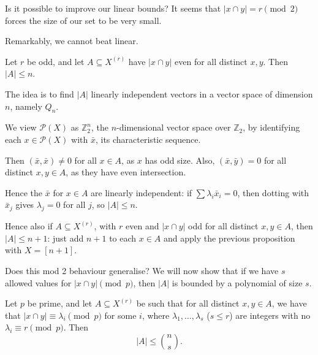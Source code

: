 \documentclass[12pt]{article}
\begin{document}
Is it possible to improve our linear bounds? It seems that $|x \cap y| = r \pmod 2$ forces the size of our set to be very small.


Remarkably, we cannot beat linear.

\begin{proposition}
	Let $r$ be odd, and let $A \subseteq X^{(r)}$ have $|x \cap y|$ even for all distinct $x, y$. Then $|A| \leq n$.
\end{proposition}

The idea is to find $|A|$ linearly independent vectors in a vector space of dimension $n$, namely $Q_n$.

\begin{proofbox}
	We view $\mathcal{P}(X)$ as $\mathbb{Z}_2^{n}$, the $n$-dimensional vector space over $\mathbb{Z}_2$, by identifying each $x \in \mathcal{P}(X)$ with $\bar x$, its characteristic sequence.

	Then $(\bar x, \bar x) \neq 0$ for all $x \in A$, as $x$ has odd size. Also, $(\bar x, \bar y) = 0$ for all distinct $x, y \in A$, as they have even intersection.

	Hence the $\bar x$ for $x \in A$ are linearly independent: if $\sum \lambda_i \bar x_i = 0$, then dotting with $\bar x_j$ gives $\lambda_j = 0$ for all $j$, so $|A| \leq n$.
\end{proofbox}

\begin{remark}
	Hence also if $A \subseteq X^{(r)}$, with $r$ even and $|x \cap y|$ odd for all distinct $x, y \in A$, then $|A| \leq n+1$: just add $n+1$ to each $x \in A$ and apply the previous proposition with $X = [n+1]$.
\end{remark}

Does this mod 2 behaviour generalise? We will now show that if we have $s$ allowed values for $|x \cap y| \pmod p$, then $|A|$ is bounded by a polynomial of size $s$.

\begin{theorem}
	Let $p$ be prime, and let $A \subseteq X^{(r)}$ be such that for all distinct $x, y \in A$, we have that $|x \cap y| \equiv \lambda_i \pmod p$ for some $i$, where $\lambda_1, \ldots, \lambda_s$ ($s \leq r$) are integers with no $\lambda_i \equiv r \pmod p$. Then
	\[
	|A| \leq \binom ns.
	\]
\end{theorem}
\end{document}
